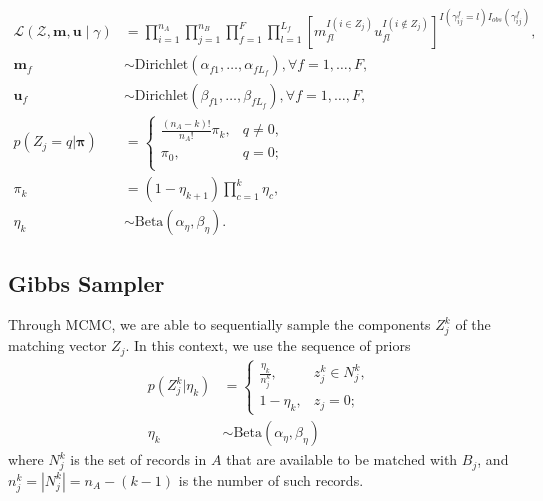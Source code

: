 \documentclass[12pt,letterpaper]{article}
\newcommand{\1}[1]{\mathbb{I}\!\left[#1\right]} %
\begin{document}
\begin{subequations}
	\begin{align}
		\mathcal{L}(\mathcal{Z}, \bm{m}, \bm{u} \mid \gamma) &= \prod_{i=1}^{n_A}  \prod_{j=1}^{n_B}\prod_{f=1}^{F}\prod_{l=1}^{L_f}\left[  m_{fl}^{I(i \in Z_j)}u_{fl}^{I(i \notin Z_j)}\right]^{I(\gamma_{ij}^f = l)I_{obs}(\gamma_{ij}^f)}, \label{eqn:likelihood}\\
		\bm{m}_f &\sim \text{Dirichlet}(\alpha_{f1}, \ldots, \alpha_{f L_f}), \forall f = 1, \ldots, F, \label{eqn:m} \\
		\bm{u}_f &\sim \text{Dirichlet}(\beta_{f1}, \ldots, \beta_{f L_f}),\forall f = 1, \ldots, F,  \label{eqn:u}\\
		p(Z_j = q| \bm{\pi})  &=
		\begin{cases} 
			\frac{(n_A - k)!}{n_A!} \pi_k,  & q \neq 0, \\
			\pi_0, &  q  = 0; \\
		\end{cases} \label{eqn:z}\\
		\pi_k &= (1 - \eta_{k+1}) \prod_{c=1}^{k} \eta_c,  \\
		\eta_k &\sim \text{Beta}(\alpha_{\eta}, \beta_{\eta})\label{eqn:pi}.
	\end{align}
\end{subequations}



\subsection{Gibbs Sampler}
Through MCMC, we are able to sequentially sample the components $Z_j^k$ of the matching vector $Z_j$. In this context, we use the sequence of priors
\begin{align}
	p(Z_j^k|\eta_k) &= \begin{cases}
		\frac{\eta_k}{n_j^k}, &  z_j^k \in N_j^k, \\
		1 - \eta_k, & z_j = 0;
		\end{cases} \\
	\eta_k &\sim \text{Beta}(\alpha_{\eta}, \beta_{\eta})
\end{align}
where $N_j^k$ is the set of records in $A$ that are available to be matched with $B_j$, and $n_j^k = |N_j^k| = n_A - (k - 1)$ is the number of such records. 
\end{document}
